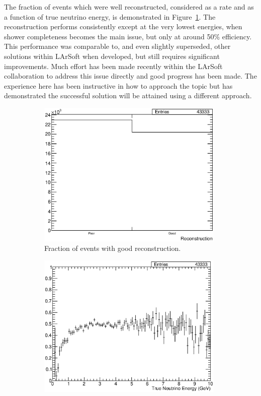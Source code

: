 The fraction of events which were well reconstructed, considered as a rate and as a function of true neutrino energy, is demonstrated in Figure~\ref{fig:GoodReconstruction}.  The reconstruction performs consistently except at the very lowest energies, when shower completeness becomes the main issue, but only at around 50\% efficiency.  This performance was comparable to, and even slightly superseded, other solutions within LArSoft when developed, but still requires significant improvements.  Much effort has been made recently within the LArSoft collaboration to address this issue directly and good progress has been made.  The experience here has been instructive in how to approach the topic but has demonstrated the successful solution will be attained using a different approach.

\begin{figure}
  \centering
  \begin{subfigure}[t]{0.48\linewidth}
    \centering
    \includegraphics[width=0.98\textwidth]{GoodRecon.eps}
    \caption{Fraction of events with good reconstruction.}
    \label{fig:GoodReconstruction}
  \end{subfigure}
  \hfill
  \begin{subfigure}[t]{0.48\linewidth}
    \centering
    \includegraphics[width=0.98\textwidth]{GoodReconEnergy.eps}

\end{subfigure}
\end{figure}
